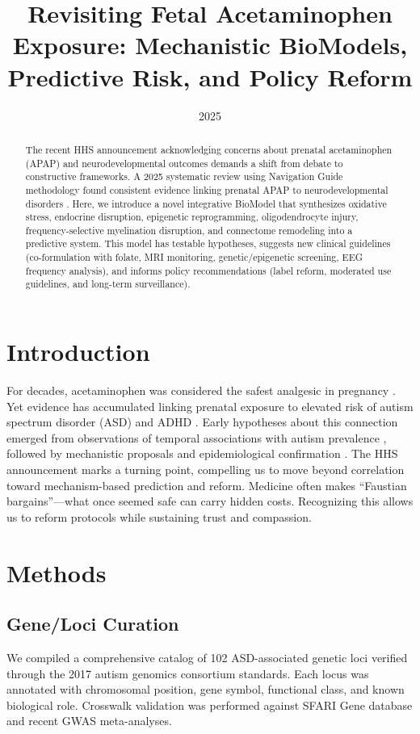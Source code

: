 \documentclass[12pt]{article}
\title{Revisiting Fetal Acetaminophen Exposure: Mechanistic BioModels, Predictive Risk, and Policy Reform}
\author{}
\date{2025}
\begin{document}
\maketitle

\begin{abstract}
The recent HHS announcement acknowledging concerns about prenatal acetaminophen (APAP) and neurodevelopmental outcomes demands a shift from debate to constructive frameworks. A 2025 systematic review using Navigation Guide methodology found consistent evidence linking prenatal APAP to neurodevelopmental disorders \citep{navarro2025}. Here, we introduce a novel integrative BioModel that synthesizes oxidative stress, endocrine disruption, epigenetic reprogramming, oligodendrocyte injury, frequency-selective myelination disruption, and connectome remodeling into a predictive system. This model has testable hypotheses, suggests new clinical guidelines (co-formulation with folate, MRI monitoring, genetic/epigenetic screening, EEG frequency analysis), and informs policy recommendations (label reform, moderated use guidelines, and long-term surveillance).
\end{abstract}

\section{Introduction}
For decades, acetaminophen was considered the safest analgesic in pregnancy \citep{kristensen2016}. Yet evidence has accumulated linking prenatal exposure to elevated risk of autism spectrum disorder (ASD) and ADHD \citep{masarwa2018,chen2023}. Early hypotheses about this connection emerged from observations of temporal associations with autism prevalence \citep{schultz2008,torres2003,shaw2013}, followed by mechanistic proposals \citep{parker2020} and epidemiological confirmation \citep{liew2016,avella2016}. The HHS announcement marks a turning point, compelling us to move beyond correlation toward mechanism-based prediction and reform. Medicine often makes ``Faustian bargains''---what once seemed safe can carry hidden costs. Recognizing this allows us to reform protocols while sustaining trust and compassion.

\section{Methods}

\subsection{Gene/Loci Curation}
We compiled a comprehensive catalog of 102 ASD-associated genetic loci verified through the 2017 autism genomics consortium standards. Each locus was annotated with chromosomal position, gene symbol, functional class, and known biological role. Crosswalk validation was performed against SFARI Gene database and recent GWAS meta-analyses.
\end{document}
